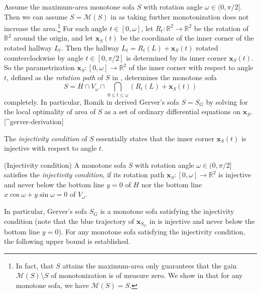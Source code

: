 Assume the maximum-area monotone sofa \(S\) with rotation angle \(\omega \in (0, \pi/2]\). Then we can assume \(S = \mathcal{M}(S)\) in  as taking further monotonization does not increase the area.\footnote{In fact, that \(S\) attains the maximum-area only guarantees that the gain \(\mathcal{M}(S) \setminus S\) of monotonization is of measure zero. We show in  that for any monotone sofa, we have \(\mathcal{M}(S) = S\).} For each angle \(t \in [0, \omega]\), let \(R_t : \mathbb{R}^2 \to \mathbb{R}^2\) be the rotation of \(\mathbb{R}^2\) around the origin, and let \(\mathbf{x}_S(t)\) be the coordinate of the inner corner of the rotated hallway \(L_t\). Then the hallway \(L_t = R_t(L) + \mathbf{x}_S(t)\) rotated counterclockwise by angle \(t \in [0, \pi/2]\) is determined by its inner corner \(\mathbf{x}_S(t)\). So the parametrization \(\mathbf{x}_S : [0, \omega] \to \mathbb{R}^2\) of the inner corner with respect to angle \(t\), defined as the \emph{rotation path} of \(S\) in \autocite{romikDifferentialEquationsExact2018}, determines the monotone sofa
\[
S = H \cap V_\omega \cap \bigcap_{0 \leq t \leq \omega} \left( R_t(L) + \mathbf{x}_S(t) \right) 
\]
completely. In particular, Romik in \autocite{romikDifferentialEquationsExact2018} derived Gerver’s sofa \(S = S_G\) by solving for the local optimality of area of \(S\) as a set of ordinary differential equations on \(\mathbf{x}_S\).{[}\^{}gerver-derivation{]}

The \emph{injectivity condition} of \(S\) essentially states that the inner corner \(\mathbf{x}_S(t)\) is injective with respect to angle \(t\).

\begin{definition}

(Injectivity condition) A monotone sofa \(S\) with rotation angle \(\omega \in (0, \pi/2]\) satisfies the \emph{injectivity condition}, if its rotation path \(\mathbf{x}_S : [0, \omega] \to \mathbb{R}^2\) is injective and never below the bottom line \(y = 0\) of \(H\) nor the bottom line \(x \cos \omega + y \sin \omega = 0\) of \(V_\omega\).

\label{def:injectivity}
\end{definition}

In particular, Gerver’s sofa \(S_G\) is a monotone sofa satisfying the injectivity condition (note that the blue trajectory of \(\mathbf{x}_{S_G}\) in  is injective and never below the bottom line \(y=0\)). For any monotone sofa satisfying the injectivity condition, the following upper bound is established.


